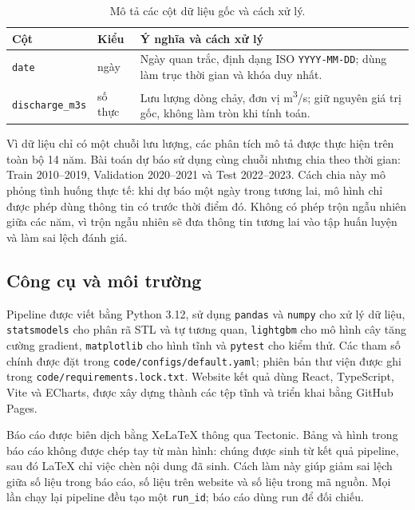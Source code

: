 \begin{table}[H]
\centering
\small
\begin{tabularx}{\linewidth}{@{}llX@{}}
\toprule
\textbf{Cột} & \textbf{Kiểu} & \textbf{Ý nghĩa và cách xử lý} \\
\midrule
\texttt{date} & ngày & Ngày quan trắc, định dạng ISO \texttt{YYYY-MM-DD}; dùng làm trục thời gian và khóa duy nhất. \\
\texttt{discharge\_m3s} & số thực & Lưu lượng dòng chảy, đơn vị m\textsuperscript{3}/s; giữ nguyên giá trị gốc, không làm tròn khi tính toán. \\
\bottomrule
\end{tabularx}
\caption{Mô tả các cột dữ liệu gốc và cách xử lý.}
\label{tab:schema}
\end{table}

Vì dữ liệu chỉ có một chuỗi lưu lượng, các phân tích mô tả được thực hiện trên toàn
bộ 14 năm. Bài toán dự báo sử dụng cùng chuỗi nhưng chia theo thời gian: Train
2010--2019, Validation 2020--2021 và Test 2022--2023. Cách chia này mô phỏng tình
huống thực tế: khi dự báo một ngày trong tương lai, mô hình chỉ được phép dùng thông
tin có trước thời điểm đó. Không có phép trộn ngẫu nhiên giữa các năm, vì trộn ngẫu
nhiên sẽ đưa thông tin tương lai vào tập huấn luyện và làm sai lệch đánh giá.

\subsection{Công cụ và môi trường}

Pipeline được viết bằng Python 3.12, sử dụng \texttt{pandas} \cite{mckinney2010} và
\texttt{numpy} \cite{harris2020} cho xử lý dữ liệu, \texttt{statsmodels}
\cite{seabold2010} cho phân rã STL và tự tương quan, \texttt{lightgbm}
\cite{ke2017} cho mô hình cây tăng cường gradient, \texttt{matplotlib}
\cite{hunter2007} cho hình tĩnh và \texttt{pytest} cho kiểm thử. Các tham số chính được đặt trong
\texttt{code/configs/default.yaml}; phiên bản thư viện được ghi trong
\texttt{code/requirements.lock.txt}. Website kết quả dùng React, TypeScript, Vite và
ECharts, được xây dựng thành các tệp tĩnh và triển khai bằng GitHub Pages.

Báo cáo được biên dịch bằng XeLaTeX thông qua Tectonic. Bảng và hình trong báo cáo
không được chép tay từ màn hình: chúng được sinh từ kết quả pipeline, sau đó LaTeX
chỉ việc chèn nội dung đã sinh. Cách làm này giúp giảm sai lệch giữa số liệu trong
báo cáo, số liệu trên website và số liệu trong mã nguồn. Mọi lần chạy lại pipeline
đều tạo một \texttt{run\_id}; báo cáo dùng run \RunId{} để đối chiếu.

